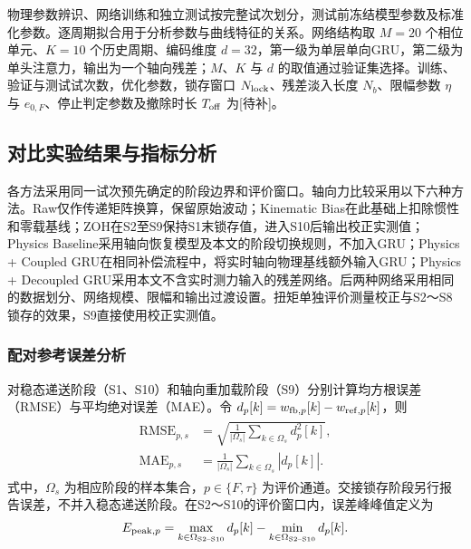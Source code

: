\documentclass{JQRnew}
\providecommand{\RevisionColor}{\color{black}}
\newcommand{\revbegin}{\begingroup\RevisionColor}
\newcommand{\revend}{\par\endgroup}
\begin{document}
\revbegin
物理参数辨识、网络训练和独立测试按完整试次划分，测试前冻结模型参数及标准化参数。逐周期拟合用于分析参数与曲线特征的关系。网络结构取 $M=20$ 个相位单元、$K=10$ 个历史周期、编码维度 $d=32$，第一级为单层单向GRU，第二级为单头注意力，输出为一个轴向残差；$M$、$K$ 与 $d$ 的取值通过验证集选择。训练、验证与测试试次数，优化参数，锁存窗口 $N_{\rm lock}$、残差淡入长度 $N_b$、限幅参数 $\eta$ 与 $e_{0,F}$、停止判定参数及撤除时长 $T_{\rm off}$ 为[待补]。
\revend

\subsection{对比实验结果与指标分析}

\revbegin
各方法采用同一试次预先确定的阶段边界和评价窗口。轴向力比较采用以下六种方法。Raw仅作传递矩阵换算，保留原始波动；Kinematic Bias在此基础上扣除惯性和零载基线；ZOH在S2至S9保持S1末锁存值，进入S10后输出校正实测值；Physics Baseline采用轴向恢复模型及本文的阶段切换规则，不加入GRU；Physics + Coupled GRU在相同补偿流程中，将实时轴向物理基线额外输入GRU；Physics + Decoupled GRU采用本文不含实时测力输入的残差网络。后两种网络采用相同的数据划分、网络规模、限幅和输出过渡设置。扭矩单独评价测量校正与S2～S8锁存的效果，S9直接使用校正实测值。
\revend

\revbegin
\subsubsection{配对参考误差分析}
\revend

\revbegin
对稳态递送阶段（S1、S10）和轴向重加载阶段（S9）分别计算均方根误差（RMSE）与平均绝对误差（MAE）。令 $d_p[k]=w_{{\rm fb},p}[k]-w_{{\rm ref},p}[k]$，则
\begin{align}
\label{eq:rmse-mae}
\begin{aligned}
\mathrm{RMSE}_{p,s}&=\sqrt{\frac{1}{|\Omega_s|}\sum_{k\in\Omega_s}d_p^2[k]},\\
\mathrm{MAE}_{p,s}&=\frac{1}{|\Omega_s|}\sum_{k\in\Omega_s}|d_p[k]|.
\end{aligned}
\end{align}
式中，$\Omega_s$ 为相应阶段的样本集合，$p\in\{F,\tau\}$ 为评价通道。交接锁存阶段另行报告误差，不并入稳态递送阶段。在S2～S10的评价窗口内，误差峰峰值定义为
\begin{align}
\label{eq:peak-error}
E_{{\rm peak},p}=
\max_{k\in\Omega_{\rm S2\text{--}S10}}d_p[k]
-\min_{k\in\Omega_{\rm S2\text{--}S10}}d_p[k].
\end{align}
\revend
\end{document}
